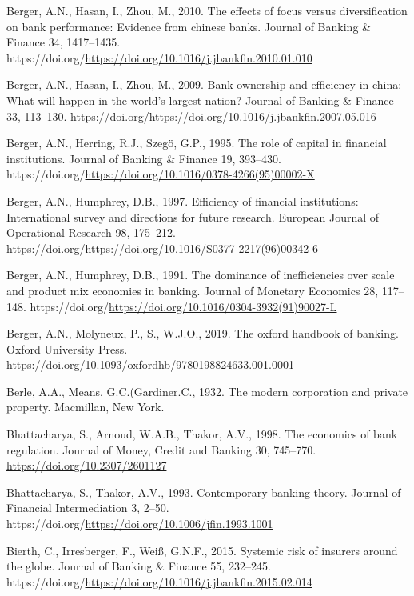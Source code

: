 \documentclass[
  12pt,
  a4paper,
]{scrreprt}
\newlength{\cslhangindent}
\newenvironment{CSLReferences}[2] %
 {\begin{list}{}{%
  \setlength{\itemindent}{0pt}
  \setlength{\leftmargin}{0pt}
  \setlength{\parsep}{0pt}
  \ifodd #1
   \setlength{\leftmargin}{\cslhangindent}
   \setlength{\itemindent}{-1\cslhangindent}
  \fi
  \setlength{\itemsep}{#2\baselineskip}}}
 {\end{list}}
\begin{document}
{{{{\begin{CSLReferences}{1}{0}
Berger, A.N., Hasan, I., Zhou, M., 2010. The effects of focus versus
diversification on bank performance: Evidence from chinese banks.
Journal of Banking \& Finance 34, 1417--1435.
https://doi.org/\url{https://doi.org/10.1016/j.jbankfin.2010.01.010}

Berger, A.N., Hasan, I., Zhou, M., 2009. Bank ownership and efficiency
in china: What will happen in the world's largest nation? Journal of
Banking \& Finance 33, 113--130.
https://doi.org/\url{https://doi.org/10.1016/j.jbankfin.2007.05.016}

Berger, A.N., Herring, R.J., Szegö, G.P., 1995. The role of capital in
financial institutions. Journal of Banking \& Finance 19, 393--430.
https://doi.org/\url{https://doi.org/10.1016/0378-4266(95)00002-X}

Berger, A.N., Humphrey, D.B., 1997. Efficiency of financial
institutions: International survey and directions for future research.
European Journal of Operational Research 98, 175--212.
https://doi.org/\url{https://doi.org/10.1016/S0377-2217(96)00342-6}

Berger, A.N., Humphrey, D.B., 1991. The dominance of inefficiencies over
scale and product mix economies in banking. Journal of Monetary
Economics 28, 117--148.
https://doi.org/\url{https://doi.org/10.1016/0304-3932(91)90027-L}

Berger, A.N., Molyneux, P., S., W.J.O., 2019. The oxford handbook of
banking. Oxford University Press.
\url{https://doi.org/10.1093/oxfordhb/9780198824633.001.0001}

Berle, A.A., Means, G.C.(Gardiner.C., 1932. The modern corporation and
private property. Macmillan, New York.

Bhattacharya, S., Arnoud, W.A.B., Thakor, A.V., 1998. The economics of
bank regulation. Journal of Money, Credit and Banking 30, 745--770.
\url{https://doi.org/10.2307/2601127}

Bhattacharya, S., Thakor, A.V., 1993. Contemporary banking theory.
Journal of Financial Intermediation 3, 2--50.
https://doi.org/\url{https://doi.org/10.1006/jfin.1993.1001}

Bierth, C., Irresberger, F., Weiß, G.N.F., 2015. Systemic risk of
insurers around the globe. Journal of Banking \& Finance 55, 232--245.
https://doi.org/\url{https://doi.org/10.1016/j.jbankfin.2015.02.014}


\end{CSLReferences}}}}}
\end{document}
